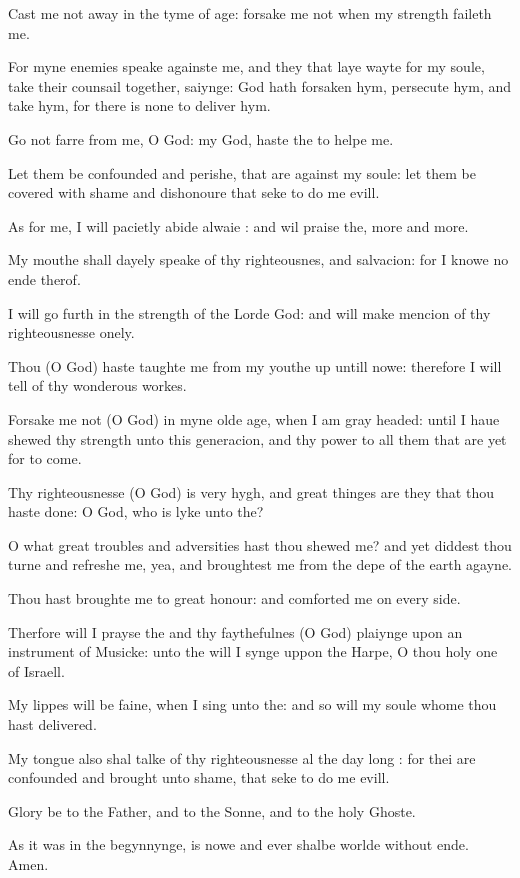 Cast me not away in the tyme of age: forsake me not
when my strength faileth me.

For myne enemies speake againste me, and they that
laye wayte for my soule, take their counsail together, saiynge: God hath
forsaken hym, persecute hym, and take hym, for there is none to deliver
hym.

Go not farre from me, O God: my God, haste the to helpe
me.

Let them be confounded and perishe, that are against
my soule: let them be covered with shame and dishonoure that seke to do
me evill.

As for me, I will pacietly abide alwaie : and wil praise
the, more and more.

My mouthe shall dayely speake of thy righteousnes,
and salvacion: for I knowe no ende therof.

I will go furth in the strength of the Lorde God: and
will make mencion of thy righteousnesse onely.

Thou (O God) haste taughte me from my youthe up untill
nowe: therefore I will tell of thy wonderous workes.

Forsake me not (O God) in myne olde age, when I am
gray headed: until I haue shewed thy strength unto this generacion, and
thy power to all them that are yet for to come.

Thy righteousnesse (O God) is very hygh, and great
thinges are they that thou haste done: O God, who is lyke unto the?

O what great troubles and adversities hast thou shewed
me? and yet diddest thou turne and refreshe me, yea, and broughtest me
from the depe of the earth agayne.

Thou hast broughte me to great honour: and comforted
me on every side.

Therfore will I prayse the and thy faythefulnes (O
God) plaiynge upon an instrument of Musicke: unto the will I synge uppon
the Harpe, O thou holy one of Israell.

My lippes will be faine, when I sing unto the: and
so will my soule whome thou hast delivered.

My tongue also shal talke of thy righteousnesse al
the day long : for thei are confounded and brought unto shame, that seke
to do me evill.

Glory be to the Father, and to the Sonne, and to the
holy Ghoste.

As it was in the begynnynge, is nowe and ever shalbe
worlde without ende. Amen.

